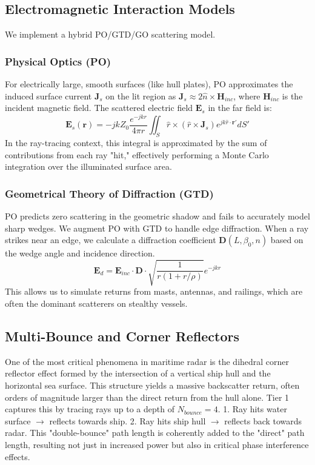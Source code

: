 \documentclass[conf]{new-aiaa}
\begin{document}
\subsection{Electromagnetic Interaction Models}
We implement a hybrid PO/GTD/GO scattering model.

\subsubsection{Physical Optics (PO)}
For electrically large, smooth surfaces (like hull plates), PO approximates the induced surface current $\mathbf{J}_s$ on the lit region as $\mathbf{J}_s \approx 2 \hat{n} \times \mathbf{H}_{inc}$, where $\mathbf{H}_{inc}$ is the incident magnetic field. The scattered electric field $\mathbf{E}_s$ in the far field is:
\begin{equation}
    \mathbf{E}_s(\mathbf{r}) = -j k Z_0 \frac{e^{-jkr}}{4\pi r} \iint_S \hat{r} \times (\hat{r} \times \mathbf{J}_s) e^{jk \hat{r} \cdot \mathbf{r}'} dS'
\end{equation}
In the ray-tracing context, this integral is approximated by the sum of contributions from each ray "hit," effectively performing a Monte Carlo integration over the illuminated surface area.

\subsubsection{Geometrical Theory of Diffraction (GTD)}
PO predicts zero scattering in the geometric shadow and fails to accurately model sharp wedges. We augment PO with GTD to handle edge diffraction. When a ray strikes near an edge, we calculate a diffraction coefficient $\mathbf{D}(L, \beta_0, n)$ based on the wedge angle and incidence direction.
\begin{equation}
    \mathbf{E}_d = \mathbf{E}_{inc} \cdot \mathbf{D} \cdot \sqrt{\frac{1}{r(1+r/\rho)}} e^{-jkr}
\end{equation}
This allows us to simulate returns from masts, antennas, and railings, which are often the dominant scatterers on stealthy vessels.

\subsection{Multi-Bounce and Corner Reflectors}
One of the most critical phenomena in maritime radar is the dihedral corner reflector effect formed by the intersection of a vertical ship hull and the horizontal sea surface. This structure yields a massive backscatter return, often orders of magnitude larger than the direct return from the hull alone.
Tier 1 captures this by tracing rays up to a depth of $N_{bounce} = 4$.
1. Ray hits water surface $\to$ reflects towards ship.
2. Ray hits ship hull $\to$ reflects back towards radar.
This "double-bounce" path length is coherently added to the "direct" path length, resulting not just in increased power but also in critical phase interference effects.
\end{document}
